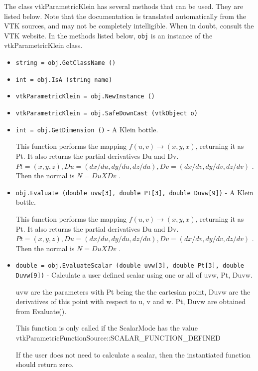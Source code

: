 The class vtkParametricKlein has several methods that can be used.
  They are listed below.
Note that the documentation is translated automatically from the VTK sources,
and may not be completely intelligible.  When in doubt, consult the VTK website.
In the methods listed below, \verb|obj| is an instance of the vtkParametricKlein class.
\begin{itemize}
\item  \verb|string = obj.GetClassName ()|

\item  \verb|int = obj.IsA (string name)|

\item  \verb|vtkParametricKlein = obj.NewInstance ()|

\item  \verb|vtkParametricKlein = obj.SafeDownCast (vtkObject o)|

\item  \verb|int = obj.GetDimension ()| -  A Klein bottle.

 This function performs the mapping $f(u,v) \rightarrow (x,y,x)$, returning it
 as Pt. It also returns the partial derivatives Du and Dv.
 $Pt = (x, y, z), Du = (dx/du, dy/du, dz/du), Dv = (dx/dv, dy/dv, dz/dv)$ .
 Then the normal is $N = Du X Dv$ .

\item  \verb|obj.Evaluate (double uvw[3], double Pt[3], double Duvw[9])| -  A Klein bottle.

 This function performs the mapping $f(u,v) \rightarrow (x,y,x)$, returning it
 as Pt. It also returns the partial derivatives Du and Dv.
 $Pt = (x, y, z), Du = (dx/du, dy/du, dz/du), Dv = (dx/dv, dy/dv, dz/dv)$ .
 Then the normal is $N = Du X Dv$ .

\item  \verb|double = obj.EvaluateScalar (double uvw[3], double Pt[3], double Duvw[9])| -  Calculate a user defined scalar using one or all of uvw, Pt, Duvw.

 uvw are the parameters with Pt being the the cartesian point, 
 Duvw are the derivatives of this point with respect to u, v and w.
 Pt, Duvw are obtained from Evaluate().

 This function is only called if the ScalarMode has the value
 vtkParametricFunctionSource::SCALAR\_FUNCTION\_DEFINED

 If the user does not need to calculate a scalar, then the 
 instantiated function should return zero. 


\end{itemize}
